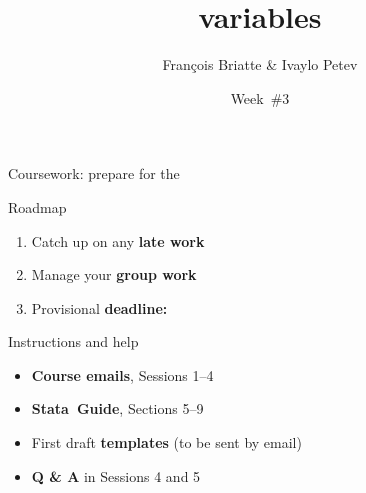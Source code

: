 \documentclass[t]{beamer}
\title{variables}
\author{François Briatte \& Ivaylo Petev}
\date{Week~\#3}
\begin{document}

	\begin{frame}[t]{Coursework: prepare for the }

    \begin{block}{Roadmap}
      \begin{enumerate}
        \item Catch up on any \textbf{late work}
        \item Manage your \textbf{group work}
        \item Provisional \textbf{deadline: }
      \end{enumerate}
    \end{block}

    \begin{block}{Instructions and help}
      \begin{itemize}
	      \item \textbf{Course emails}, Sessions 1--4
        \item \textbf{Stata~Guide}, Sections 5--9%
        \item First draft \textbf{templates} (to be sent by email)
        \item \textbf{Q \& A} in Sessions 4 and 5
      \end{itemize}
    \end{block}
    		
	\end{frame}
\end{document}
